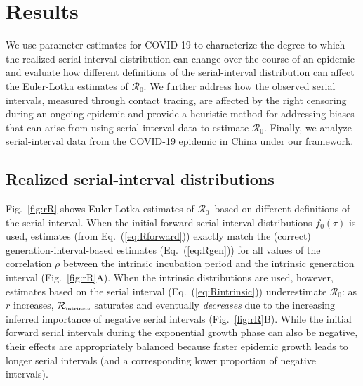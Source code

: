 \documentclass[12pt]{article}
\newcommand{\eref}[1]{Eq.~(\ref{eq:#1})}
\newcommand{\fref}[1]{Fig.~\ref{fig:#1}}
\newcommand{\Rx}[1]{\ensuremath{{\mathcal R}_{#1}}\xspace}
\newcommand{\Ro}{\Rx{0}}
\newcommand{\Rintrinsic}{\ensuremath{{\mathcal R}_{\textrm{\tiny intrinsic}}}\xspace}
\begin{document}
\section{Results}

We use parameter estimates for COVID-19 to characterize the degree to which the realized serial-interval distribution can change over the course of an epidemic and evaluate how different definitions of the serial-interval distribution can affect the Euler-Lotka estimates of \Ro.
We further address how the observed serial intervals, measured through contact tracing, are affected by the right censoring during an ongoing epidemic and provide a heuristic method for addressing biases that can arise from using serial interval data to estimate \Ro.
Finally, we analyze serial-interval data from the COVID-19 epidemic in China under our framework.

\subsection{Realized serial-interval distributions}

\fref{rR} shows Euler-Lotka estimates of \Ro\ based on different definitions of the serial interval. 
When the initial forward serial-interval distributions $f_0(\tau)$ is used, estimates (from \eref{Rforward}) exactly match the (correct) generation-interval-based estimates (\eref{Rgen}) for all values of the correlation $\rho$ between the intrinsic incubation period and the intrinsic generation interval (\fref{rR}A).
When the intrinsic distributions are used, however, estimates based on the serial interval (\eref{Rintrinsic}) underestimate \Ro: as $r$ increases, \Rintrinsic saturates and eventually \emph{decreases} due to the increasing inferred importance of negative serial intervals (\fref{rR}B).
While the initial forward serial intervals during the exponential growth phase can also be negative, their effects are appropriately balanced because faster epidemic growth leads to longer serial intervals (and a corresponding lower proportion of negative intervals).
\end{document}
